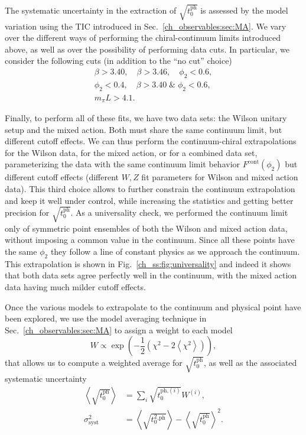 The systematic uncertainty in the extraction of $\sqrt{t_0^{\textrm{ph}}}$ is assessed by the model variation using the TIC introduced in Sec.~\ref{ch_observables:sec:MA}. We vary over the different ways of performing the chiral-continuum limits introduced above, as well as over the possibility of performing data cuts. In particular, we consider the following cuts (in addition to the ``no cut'' choice)
\begin{gather}
\beta>3.40, \quad
\beta>3.46, \quad
\phi_2<0.6, \\
\phi_2<0.4, \quad
\beta>3.40\;\&\;\phi_2<0.6, \\
m_{\pi}L>4.1.
\end{gather}

Finally, to perform all of these fits, we have two data sets: the Wilson unitary setup and the mixed action. Both must share the same continuum limit, but different cutoff effects. We can thus perform the continuum-chiral extrapolations for the Wilson data, for the mixed action, or for a combined data set, parameterizing the data with the same continuum limit behavior $F^{\textrm{cont}}(\phi_2)$ but different cutoff effects (different $W,Z$ fit parameters for Wilson and mixed action data). This third choice allows to further constrain the continuum extrapolation and keep it well under control, while increasing the statistics and getting better precision for $\sqrt{t_0^{\textrm{ph}}}$. As a universality check, we performed the continuum limit only of symmetric point ensembles of both the Wilson and mixed action data, without imposing a common value in the continuum. Since all these points have the same $\phi_2$ they follow a line of constant physics as we approach the continuum. This extrapolation is shown in Fig.~\ref{ch_ss:fig:universality} and indeed it shows that both data sets agree perfectly well in the continuum, with the mixed action data having much milder cutoff effects.

Once the various models to extrapolate to the continuum and physical point have been explored, we use the model averaging technique in Sec.~\ref{ch_observables:sec:MA} to assign a weight to each model 
\begin{equation}
\label{ch_ss:eq:W}
W\propto\exp\left(-\frac{1}{2}\left(\chi^2-2\left<\chi^2\right>\right)\right),
\end{equation}
that allows us to compute a weighted average for $\sqrt{t_0^{\textrm{ph}}}$, as well as the associated systematic uncertainty
\begin{align}
\left<\sqrt{t_0^{\textrm{ph}}}\right>&=\sum_i\sqrt{t_0^{\textrm{ph,}(i)}}W^{(i)},\\
\sigma^2_{\textrm{syst}}&=\left<\sqrt{t_0^2^{\textrm{,ph}}}\right>-\left<\sqrt{t_0^{\textrm{ph}}}\right>^2.
\end{align}

